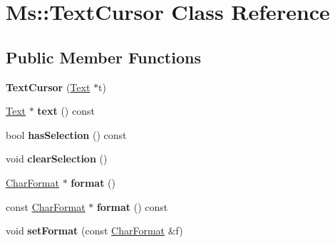 \hypertarget{class_ms_1_1_text_cursor}{}\section{Ms\+:\+:Text\+Cursor Class Reference}
\label{class_ms_1_1_text_cursor}
\subsection*{Public Member Functions}
\begin{DoxyCompactItemize}
\item 
\mbox{\label{class_ms_1_1_text_cursor_a623fc55ff26df21d978f9279862e3af1}} 
{\bfseries Text\+Cursor} (\hyperlink{class_ms_1_1_text}{Text} $\ast$t)
\item 
\mbox{\label{class_ms_1_1_text_cursor_a9247e72844d918168b1c3defcf2f2286}} 
\hyperlink{class_ms_1_1_text}{Text} $\ast$ {\bfseries text} () const
\item 
\mbox{\label{class_ms_1_1_text_cursor_a689a455b1276a038b652f92cc4d80b06}} 
bool {\bfseries has\+Selection} () const
\item 
\mbox{\label{class_ms_1_1_text_cursor_a03b2d0a6f86f9414226e693972eb11ed}} 
void {\bfseries clear\+Selection} ()
\item 
\mbox{\label{class_ms_1_1_text_cursor_a4457e59ff1af87233fdd37aa845b58e9}} 
\hyperlink{class_ms_1_1_char_format}{Char\+Format} $\ast$ {\bfseries format} ()
\item 
\mbox{\label{class_ms_1_1_text_cursor_aa49f92ccc5aa500d3f06045051d98134}} 
const \hyperlink{class_ms_1_1_char_format}{Char\+Format} $\ast$ {\bfseries format} () const
\item 
\mbox{\label{class_ms_1_1_text_cursor_a8fd6f69f1a363f059267170c3c681246}} 
void {\bfseries set\+Format} (const \hyperlink{class_ms_1_1_char_format}{Char\+Format} \&f)
\item 
\mbox{\label{class_ms_1_1_text_cursor_a6dfeee11e4eeda1fe7b0680d5d31e675}} 

\end{DoxyCompactItemize}
